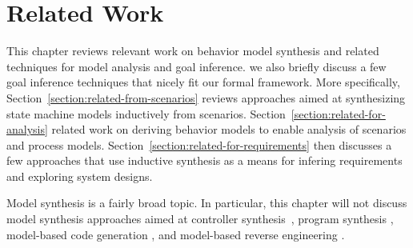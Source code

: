 \chapter{Related Work\label{chapter:related-work}}

This chapter reviews relevant work on behavior model synthesis and related techniques for model analysis and goal inference. we also briefly discuss a few goal inference techniques that nicely fit our formal framework. More specifically, Section~\ref{section:related-from-scenarios} reviews approaches aimed at synthesizing state machine models inductively from scenarios. Section~\ref{section:related-for-analysis} related work on deriving behavior models to enable analysis of scenarios and process models. Section~\ref{section:related-for-requirements} then discusses a few approaches that use inductive synthesis as a means for infering requirements and exploring system designs.

Model synthesis is a fairly broad topic. In particular, this chapter will not discuss model synthesis approaches aimed at controller synthesis~\cite{Clarke:1981, Pnueli:1989, Asarin:1995}, program synthesis \cite{Manna:1971, Balzer:1985, Wasowski:2003}, model-based code generation \cite{Kohler:2000, Wasowski:2003}, and model-based reverse engineering \cite{Briand:2003, Yu:2005}.





